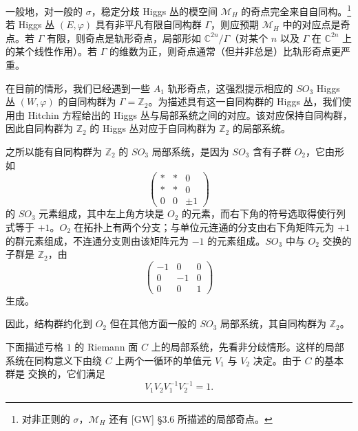 一般地，对一般的 $\sigma$，稳定分歧 Higgs 丛的模空间 $\mathcal{M}_H$ 的奇点完全来自自同构。\footnote{对非正则的 $\sigma$，$\mathcal{M}_H$ 还有 [GW] §3.6 所描述的局部奇点。} 若 Higgs 丛 $(E,\varphi)$ 具有非平凡有限自同构群 $\Gamma$，则应预期 $\mathcal{M}_H$ 中的对应点是奇点。若 $\Gamma$ 有限，则奇点是轨形奇点，局部形如 $\mathbb{C}^{2n}/\Gamma$（对某个 $n$ 以及 $\Gamma$ 在 $\mathbb{C}^{2n}$ 上的某个线性作用）。若 $\Gamma$ 的维数为正，则奇点通常（但并非总是）比轨形奇点更严重。

在目前的情形，我们已经遇到一些 $A_1$ 轨形奇点，这强烈提示相应的 $SO_3$ Higgs 丛 $(W,\varphi)$ 的自同构群为 $\Gamma=\mathbb{Z}_2$。为描述具有这一自同构群的 Higgs 丛，我们使用由 Hitchin 方程给出的 Higgs 丛与局部系统之间的对应。该对应保持自同构群，因此自同构群为 $\mathbb{Z}_2$ 的 Higgs 丛对应于自同构群为 $\mathbb{Z}_2$ 的局部系统。

之所以能有自同构群为 $\mathbb{Z}_2$ 的 $SO_3$ 局部系统，是因为 $SO_3$ 含有子群 $O_2$，它由形如
\begin{equation}\tag{3.21}
\begin{pmatrix}
* & * & 0\\
* & * & 0\\
0 & 0 & \pm1
\end{pmatrix}
\end{equation}
的 $SO_3$ 元素组成，其中左上角方块是 $O_2$ 的元素，而右下角的符号选取得使行列式等于 $+1$。$O_2$ 在拓扑上有两个分支；与单位元连通的分支由右下角矩阵元为 $+1$ 的群元素组成，不连通分支则由该矩阵元为 $-1$ 的元素组成。$SO_3$ 中与 $O_2$ 交换的子群是 $\mathbb{Z}_2$，由
\begin{equation}\tag{3.22}
\begin{pmatrix}
-1 & 0 & 0\\
0 & -1 & 0\\
0 & 0 & 1
\end{pmatrix}
\end{equation}
生成。

因此，结构群约化到 $O_2$ 但在其他方面一般的 $SO_3$ 局部系统，其自同构群为 $\mathbb{Z}_2$。

下面描述亏格 $1$ 的 Riemann 面 $C$ 上的局部系统，先看非分歧情形。这样的局部系统在同构意义下由绕 $C$ 上两个一循环的单值元 $V_1$ 与 $V_2$ 决定。由于 $C$ 的基本群是
交换的，它们满足
\begin{equation}\tag{3.23}
V_1V_2V_1^{-1}V_2^{-1}=1.
\end{equation}

